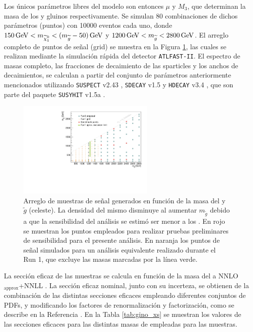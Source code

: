Los únicos parámetros libres del modelo son entonces $\mu$ y $M_3$, que determinan la masa de los \ninoone y gluinos respectivamente. Se simulan 80 combinaciones de dichos parámetros (puntos) con 10000 eventos cada uno, donde $150\,\gev<m_{\ninoone}<(m_{\gluino}-50)\,\gev$ y $1200\,\text{GeV} < m_{\widetilde{g}}<2800\,\text{GeV}$. El arreglo completo de puntos de señal (grid) se muestra en la Figura \ref{fig:grid_points}, las cuales se realizan mediante la simulación rápida del detector \texttt{ATLFAST-II}. El espectro de masas completo, las fracciones de decaimiento de las sparticles y los anchos de decaimientos, se calculan a partir del conjunto de parámetros anteriormente mencionados utilizando {\texttt{SUSPECT} v2.43} \cite{Djouadi2007426}, {\texttt{SDECAY} v1.5} \cite{Muhlleitner:2004mka} y {\texttt{HDECAY} v3.4} \cite{Djouadi:1997yw}, que son parte del paquete {\texttt{SUSYHIT} v1.5a} \cite{Djouadi:2006bz}.


\begin{figure}
  \centering
  \includegraphics[width=0.6\textwidth]{images/analysis/phb_grid.pdf}
  \caption{Arreglo de muestras de señal generados en función de la masa del \ninoone y $\tilde{g}$ (celeste). La densidad del mismo disminuye al aumentar $m_{\tilde{g}}$ debido a que la sensibilidad del análisis se estimó ser menor a los . En rojo se muestran los puntos empleados para realizar pruebas preliminares de sensibilidad para el presente análisis. En naranja los puntos de señal simulados para un análisis equivalente realizado durante el Run 1, que excluye las masas marcadas por la línea verde.}
  \label{fig:grid_points}
\end{figure}

\begin{sloppypar} %
La sección eficaz de las muestras se calcula en función de la masa del \gluino a 
NNLO$_\text{approx}$+NNLL \cite{Beenakker:1996ch, Kulesza:2008jb, Kulesza:2009kq, Beenakker:2009ha, Beenakker:2011fu}. La sección eficaz nominal, junto con su incerteza, se obtienen de la combinación 
de las distintas secciones eficaces empleando diferentes conjuntos de PDFs, y modificando los factores de renormalización y factorización, como se describe en la Referencia \cite{Borschensky:2014cia}. En la Tabla \ref{tab:gino_xs} se muestran los valores de las secciones eficaces para las distintas masas de \gluino empleadas para las muestras.
\end{sloppypar}

